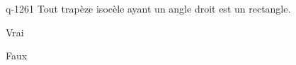 \begin{truefalse}{q-1261}
Tout trapèze isocèle ayant un angle droit est un rectangle.
\item* Vrai
\item Faux
\end{truefalse}

